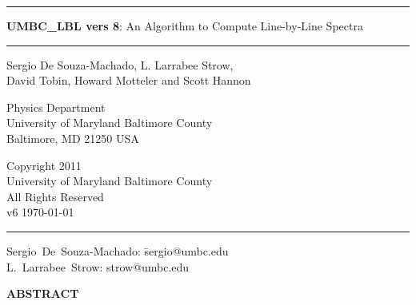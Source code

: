 \documentclass[11pt]{article}
\newcommand{\HRule}{\rule{\linewidth}{1mm}}
\newcommand{\HRulethin}{\rule{\linewidth}{0.5mm}}
\begin{document}
\thispagestyle{empty}
\vspace{2.0in}

\noindent\HRule
\begin{center}
\Huge \textbf{\textsf{UMBC\_LBL} vers 8}: An Algorithm to Compute Line-by-Line 
Spectra
\end{center}
\noindent\HRule

\vspace{0.75in}
\begin{center}
\begin{Large}
Sergio De Souza-Machado, L. Larrabee Strow,\\ David Tobin, Howard Motteler 
and Scott Hannon
\end{Large}
\end{center}

\vspace{0.5in}
\begin{center}
Physics Department\\
University of Maryland Baltimore County\\Baltimore, MD 21250 USA\\
\end{center}

\vspace{0.5in}
\begin{center}
Copyright 2011 \\
University of Maryland Baltimore County \\
All Rights Reserved\\
v6  \today\\
\end{center}

\vfill

\noindent\HRulethin
\begin{flushleft}
\begin{tabbing}
Sergio~De~Souza-Machado: \=    sergio@umbc.edu \\
L.~Larrabee~Strow:   \>        strow@umbc.edu\\
\end{tabbing}
\end{flushleft}


\newpage
\tableofcontents
\listoftables
\listoffigures

\newpage

\begin{center}
{\bf ABSTRACT}
\end{center}
\end{document}
